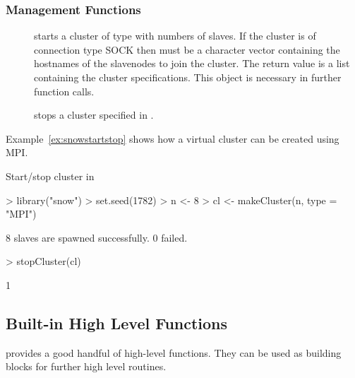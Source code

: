 \subsubsection{Management Functions}
\begin{description}
\item[]
  starts a cluster of type  with  numbers of
  slaves. If the cluster is of connection type SOCK then 
  must be a character vector containing the hostnames of the
  slavenodes to join the cluster. The return value is a list
  containing the cluster specifications. This object is necessary in
  further function calls.
\item[] stops a cluster specified in .
\end{description}
Example~\ref{ex:snowstartstop} shows how a virtual cluster can be
created using MPI. 

\begin{Example} Start/stop cluster in 
\begin{Schunk}
\begin{Sinput}
> library("snow")
> set.seed(1782)
> n <- 8
> cl <- makeCluster(n, type = "MPI")
\end{Sinput}
\begin{Soutput}
	8 slaves are spawned successfully. 0 failed.
\end{Soutput}
\begin{Sinput}
> stopCluster(cl)
\end{Sinput}
\begin{Soutput}
[1] 1
\end{Soutput}
\end{Schunk}
\label{ex:snowstartstop}
\end{Example}

\subsection{Built-in High Level Functions}

 provides a good handful of high-level functions. They can
be used as building blocks for further high level routines.

